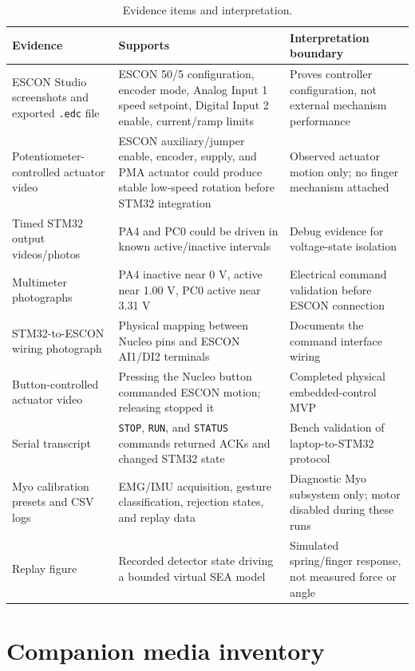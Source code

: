 \documentclass[11pt,a4paper]{report}
\begin{document}
\begin{table}[H]
\centering
\caption{Evidence items and interpretation.}
\begin{tabular}{p{}p{}p{}}
\toprule
Evidence & Supports & Interpretation boundary\\
\midrule
ESCON Studio screenshots and exported \texttt{.edc} file & ESCON 50/5 configuration, encoder mode, Analog Input 1 speed setpoint, Digital Input 2 enable, current/ramp limits & Proves controller configuration, not external mechanism performance\\
Potentiometer-controlled actuator video & ESCON auxiliary/jumper enable, encoder, supply, and PMA actuator could produce stable low-speed rotation before STM32 integration & Observed actuator motion only; no finger mechanism attached\\
Timed STM32 output videos/photos & PA4 and PC0 could be driven in known active/inactive intervals & Debug evidence for voltage-state isolation\\
Multimeter photographs & PA4 inactive near 0 V, active near 1.00 V, PC0 active near 3.31 V & Electrical command validation before ESCON connection\\
STM32-to-ESCON wiring photograph & Physical mapping between Nucleo pins and ESCON AI1/DI2 terminals & Documents the command interface wiring\\
Button-controlled actuator video & Pressing the Nucleo button commanded ESCON motion; releasing stopped it & Completed physical embedded-control MVP\\
Serial transcript & \texttt{STOP}, \texttt{RUN}, and \texttt{STATUS} commands returned ACKs and changed STM32 state & Bench validation of laptop-to-STM32 protocol\\
Myo calibration presets and CSV logs & EMG/IMU acquisition, gesture classification, rejection states, and replay data & Diagnostic Myo subsystem only; motor disabled during these runs\\
Replay figure & Recorded detector state driving a bounded virtual SEA model & Simulated spring/finger response, not measured force or angle\\
\bottomrule
\end{tabular}
\end{table}

\section{Companion media inventory}
\end{document}
